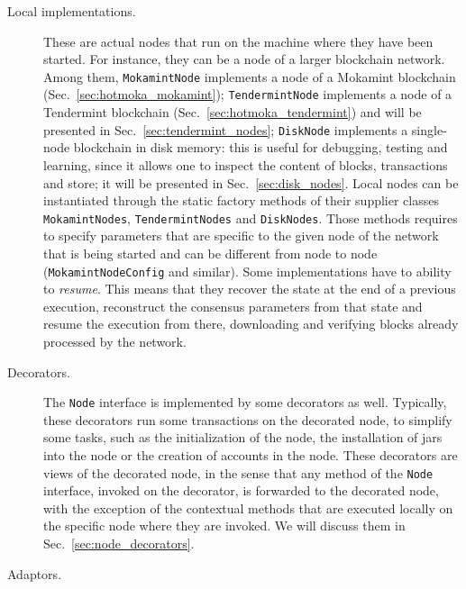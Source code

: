 \begin{description}
\item[Local implementations.]
These are actual nodes that run on the machine
where they have been started. For instance, they can be a node
of a larger blockchain network. Among them,
\texttt{MokamintNode}
implements a node of a Mokamint blockchain (Sec.~\ref{sec:hotmoka_mokamint});
\texttt{TendermintNode}
implements a node of a Tendermint blockchain (Sec.~\ref{sec:hotmoka_tendermint})
and will be presented in Sec.~\ref{sec:tendermint_nodes};
\texttt{DiskNode}
implements a single-node blockchain in disk memory: this
is useful for debugging, testing and learning, since it allows
one to inspect the content of blocks, transactions and store;
it will be presented in Sec.~\ref{sec:disk_nodes}.
Local nodes can be instantiated through the static
factory methods of their supplier classes
\texttt{MokamintNodes},
\texttt{TendermintNodes} and
\texttt{DiskNodes}.
Those methods requires to specify
parameters that are specific to the given node
of the network that is being started
and can be different from node to node
(\texttt{MokamintNodeConfig} and similar).
Some implementations have to ability to \emph{resume}.
This means that they recover the state at the end of a previous execution, reconstruct the
consensus parameters from that state and resume the execution from there, downloading
and verifying blocks already processed by the network.
%
\item[Decorators.]
The \texttt{Node} interface is implemented by some decorators as well.
Typically, these decorators run some transactions on the decorated node,
to simplify some tasks, such as the initialization of the node, the installation of jars into the node
or the creation of accounts in the node. These decorators are views of the decorated node, in the sense
that any method of the \texttt{Node} interface, invoked on the decorator, is forwarded
to the decorated node, with the exception of the contextual methods that are executed locally
on the specific node where they are invoked.
We will discuss them in Sec.~\ref{sec:node_decorators}.
%
\item[Adaptors.]

\end{description}
